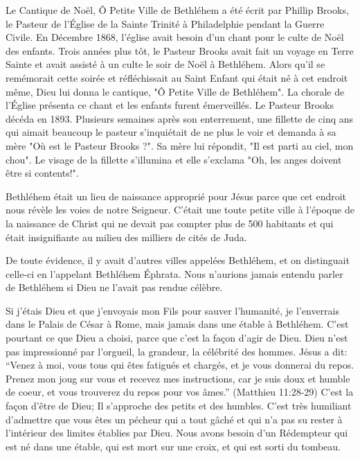 

Le Cantique de Noël, Ô Petite Ville de Bethléhem a été écrit par Phillip Brooks, le Pasteur de l'Église de la Sainte Trinité à Philadelphie pendant la Guerre Civile.
En Décembre 1868, l'église avait besoin d'un chant pour le culte de Noël des enfants. Trois années plus tôt, le Pasteur Brooks avait fait un voyage en Terre Sainte et avait assisté à un culte le soir de Noël à Bethléhem. Alors qu'il se remémorait cette soirée et réfléchissait au Saint Enfant qui était né à cet endroit même, Dieu lui donna le cantique, "Ô Petite Ville de Bethléhem". La chorale de l'Église présenta ce chant et les enfants furent émerveillés. Le Pasteur Brooks décéda en 1893. Plusieurs semaines après son enterrement, une fillette de cinq ans qui aimait beaucoup le pasteur s'inquiétait de ne plus le voir et demanda à sa mère "Où est le Pasteur Brooks ?". Sa mère lui répondit, "Il est parti au ciel, mon chou". Le visage de la fillette s'illumina et elle s'exclama "Oh, les anges doivent être si contents!".

Bethléhem était un lieu de naissance approprié pour Jésus parce que cet endroit nous révèle les voies de notre Seigneur. C'était une toute petite ville à l'époque de la naissance de Christ qui ne devait pas compter plus de 500 habitants et qui était insignifiante au milieu des milliers de cités de Juda.

De toute évidence, il y avait d'autres villes appelées Bethléhem, et on distinguait celle-ci en l'appelant Bethléhem Éphrata. Nous n'aurions jamais entendu parler de Bethléhem si Dieu ne l'avait pas rendue célèbre.

Si j'étais Dieu et que j'envoyais mon Fils pour sauver l'humanité, je l'enverrais dans le Palais de César à Rome, mais jamais dans une étable à Bethléhem. C'est pourtant ce que Dieu a choisi, parce que c'est la façon d'agir de Dieu. Dieu n'est pas impressionné par l'orgueil, la grandeur, la célébrité des hommes. Jésus a dit:
“Venez à moi, vous tous qui êtes fatigués et chargés, et je vous donnerai du repos. Prenez mon joug sur vous et recevez mes instructions, car je suis doux et humble de coeur, et vous trouverez du repos pour vos âmes.” (Matthieu 11:28-29)
C'est la façon d'être de Dieu; Il s'approche des petits et des humbles. C'est très humiliant d'admettre que vous êtes un pécheur qui a tout gâché et qui n'a pas su rester à l'intérieur des limites établies par Dieu. Nous avons besoin d'un Rédempteur qui est né dans une étable, qui est mort sur une croix, et qui est sorti du tombeau.

